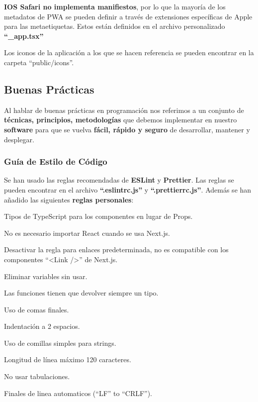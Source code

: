 \documentclass[12pt,twoside,titlepage]{report}
\begin{document}
\textbf{IOS Safari no implementa manifiestos}, por lo que la mayoría de los metadatos de PWA se pueden definir a través de extensiones específicas de Apple para las metaetiquetas. Estos están definidos en el archivo personalizado \textbf{``\_app.tsx''}

Los iconos de la aplicación a los que se hacen referencia se pueden encontrar en la carpeta ``public/icons''.


\subsection{Buenas Prácticas}

Al hablar de buenas prácticas en programación nos referimos a un conjunto de \textbf{técnicas, principios, metodologías} que debemos implementar en nuestro \textbf{software} para que se vuelva \textbf{fácil, rápido y seguro} de desarrollar, mantener y desplegar.

\subsubsection{Guía de Estilo de Código}

Se han usado las reglas recomendadas de \textbf{ESLint} y \textbf{Prettier}. Las reglas se pueden encontrar en el archivo \textbf{``.eslintrc.js''} y \textbf{``.prettierrc.js''}. Además se han añadido las siguientes \textbf{reglas personales}:

\begin{compactitem}
    \item Tipos de TypeScript para los componentes en lugar de Props.
    \item No es necesario importar React cuando se usa Next.js.
    \item Desactivar la regla para enlaces predeterminada, no es compatible con los componentes ``<Link />'' de Next.js.
    \item Eliminar variables sin usar.
    \item Las funciones tienen que devolver siempre un tipo.
    \item Uso de comas finales.
    \item Indentación a 2 espacios.
    \item Uso de comillas simples para strings.
    \item Longitud de línea máximo 120 caracteres.
    \item No usar tabulaciones.
    \item Finales de linea automaticos (``LF'' to ``CRLF'').
\end{compactitem}
\end{document}
